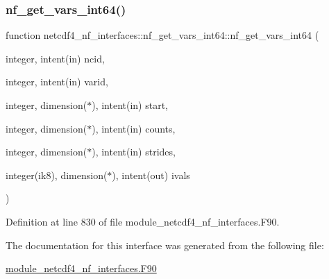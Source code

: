 \subsubsection{\texorpdfstring{nf\+\_\+get\+\_\+vars\+\_\+int64()}{nf\_get\_vars\_int64()}}
{\footnotesize\ttfamily function netcdf4\+\_\+nf\+\_\+interfaces\+::nf\+\_\+get\+\_\+vars\+\_\+int64\+::nf\+\_\+get\+\_\+vars\+\_\+int64 (\begin{DoxyParamCaption}\item[{integer, intent(in)}]{ncid,  }\item[{integer, intent(in)}]{varid,  }\item[{integer, dimension($\ast$), intent(in)}]{start,  }\item[{integer, dimension($\ast$), intent(in)}]{counts,  }\item[{integer, dimension($\ast$), intent(in)}]{strides,  }\item[{integer(ik8), dimension($\ast$), intent(out)}]{ivals }\end{DoxyParamCaption})}



Definition at line 830 of file module\+\_\+netcdf4\+\_\+nf\+\_\+interfaces.\+F90.



The documentation for this interface was generated from the following file\+:\begin{DoxyCompactItemize}
\item 
\hyperlink{module__netcdf4__nf__interfaces_8F90}{module\+\_\+netcdf4\+\_\+nf\+\_\+interfaces.\+F90}\end{DoxyCompactItemize}
